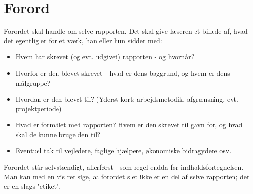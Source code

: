 \chapter*{Forord}\label{chap:forord}




Forordet skal handle om selve rapporten. Det skal give læseren et billede af, hvad det egentlig er for et værk, han eller hun sidder med:

\begin{itemize}
	\item Hvem har skrevet (og evt. udgivet) rapporten - og hvornår?
	\item Hvorfor er den blevet skrevet - hvad er dens baggrund, og hvem er dens målgruppe?
	\item Hvordan er den blevet til? (Yderst kort: arbejdsmetodik, afgrænsning, evt. projektperiode)
	\item Hvad er formålet med rapporten? Hvem er den skrevet til gavn for, og hvad skal de kunne bruge den til?
	\item Eventuel tak til vejledere, faglige hjælpere, økonomiske bidragydere osv.
\end{itemize}

Forordet står selvstændigt, allerførst - som regel endda før indholdsfortegnelsen. Man kan med en vis ret sige, at forordet slet ikke er en del af selve rapporten; det er en slags "etiket".
